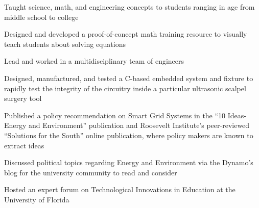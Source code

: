 \documentclass[letterpaper]{article}
\begin{document}
\begin{compactitem}
	\item Taught science, math, and engineering concepts to students ranging in age from middle school to college\\
	\item Designed and developed a proof-of-concept math training resource to visually teach students about solving equations
\end{compactitem}

\begin{compactitem}
	\item Lead and worked in a multidisciplinary team of engineers\\
	\item Designed, manufactured, and tested a C-based embedded system and fixture to rapidly test the integrity of the circuitry inside a particular ultrasonic scalpel surgery tool
\end{compactitem}

\begin{compactitem}
	\item Published a policy recommendation on Smart Grid Systems in the “10 Ideas- Energy and Environment” publication and Roosevelt Institute’s peer-reviewed “Solutions for the South” online publication, where policy makers are known to extract ideas\\
	\item Discussed political topics regarding Energy and Environment via the Dynamo’s blog for the university community to read and consider\\
	\item Hosted an expert forum on Technological Innovations in Education at the University of Florida\\\\
\end{compactitem}
\end{document}
